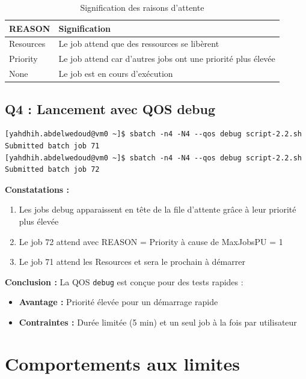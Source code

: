 \documentclass[12pt,a4paper]{article}
\newcommand{\code}[1]{\texttt{#1}}
\begin{document}
\begin{table}[h]
\centering
\begin{tabular}{|l|p{9cm}|}
\hline
\textbf{REASON} & \textbf{Signification} \\
\hline
Resources & Le job attend que des ressources se libèrent \\
Priority & Le job attend car d'autres jobs ont une priorité plus élevée \\
None & Le job est en cours d'exécution \\
\hline
\end{tabular}
\caption{Signification des raisons d'attente}
\end{table}

\subsection{Q4 : Lancement avec QOS debug}

\begin{lstlisting}
[yahdhih.abdelwedoud@vm0 ~]$ sbatch -n4 -N4 --qos debug script-2.2.sh
Submitted batch job 71
[yahdhih.abdelwedoud@vm0 ~]$ sbatch -n4 -N4 --qos debug script-2.2.sh
Submitted batch job 72
\end{lstlisting}

\textbf{Constatations :}
\begin{enumerate}
    \item Les jobs debug apparaissent en tête de la file d'attente grâce à leur priorité plus élevée
    \item Le job 72 attend avec REASON = Priority à cause de MaxJobsPU = 1
    \item Le job 71 attend les Resources et sera le prochain à démarrer
\end{enumerate}

\textbf{Conclusion :} La QOS \code{debug} est conçue pour des tests rapides :
\begin{itemize}
    \item \textbf{Avantage :} Priorité élevée pour un démarrage rapide
    \item \textbf{Contraintes :} Durée limitée (5 min) et un seul job à la fois par utilisateur
\end{itemize}

\section{Comportements aux limites}
\end{document}
